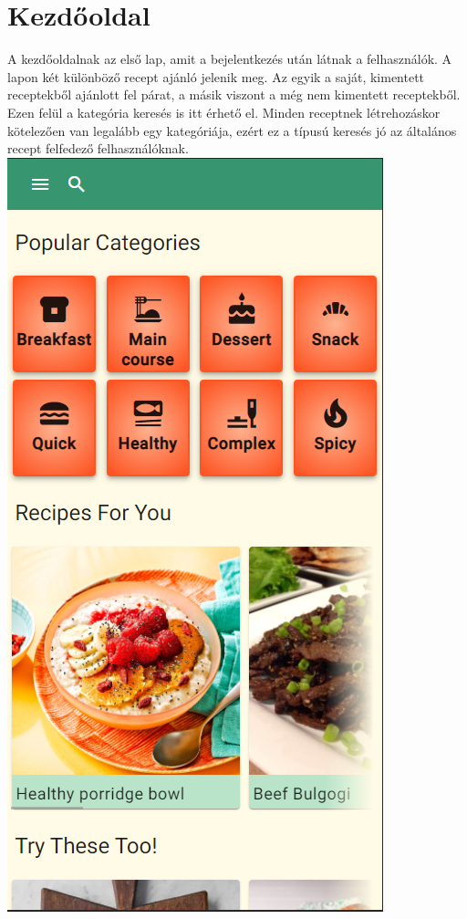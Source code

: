 \documentclass[12pt]{report}
\theoremstyle{definition}
\begin{document}
\section{Kezdőoldal}
A kezdőoldalnak az első lap, amit a bejelentkezés után látnak a felhasználók. A lapon két különböző recept ajánló jelenik meg. Az egyik a saját, kimentett receptekből ajánlott fel párat, a másik viszont a még nem kimentett receptekből. Ezen felül a kategória keresés is itt érhető el. Minden receptnek létrehozáskor kötelezően van legalább egy kategóriája, ezért ez a típusú keresés jó az általános recept felfedező felhasználóknak.
\noindent
\includegraphics[scale=0.5]{pictures/mobil_home.png}
\end{document}
